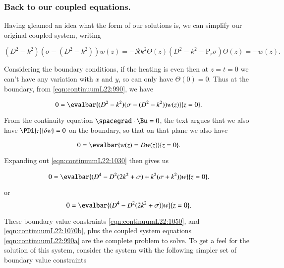 \subsubsection{Back to our coupled equations.}

Having gleamed an idea what the form of our solutions is, we can simplify our original coupled system, writing

\begin{subequations}
\label{eqn:continuumL22:990a}
\begin{equation}\label{eqn:continuumL22:990}
(D^2 - k^2) ( \sigma - (D^2 - k^2) ) w(z) = -\mathcal{R} k^2 \Theta(z)
\end{equation}
\begin{equation}\label{eqn:continuumL22:1010}
(D^2 - k^2 -\text{P}_r \sigma ) \Theta(z) = -w(z).
\end{equation}
\end{subequations}

Considering the boundary conditions, if the heating is even then at $z = t = 0$ we can't have any variation with $x$ and $y$, so can only have $\Theta(0) = 0$.  Thus at the boundary, from \ref{eqn:continuumL22:990}, we have

\begin{equation}\label{eqn:continuumL22:1030}
0 = \evalbar{(D^2 - k^2) ( \sigma - (D^2 - k^2) ) w(z)}{z = 0}.
\end{equation}

From the continuity equation $\spacegrad \cdot \Bu = 0$, the text argues that we also have $\PDi{z}{\delta w} = 0$ on the boundary, so that on that plane we also have

\begin{equation}\label{eqn:continuumL22:1050}
0 = \evalbar{w(z) = D w(z)}{z = 0}.
\end{equation}

Expanding out \ref{eqn:continuumL22:1030} then gives us

\begin{equation}\label{eqn:continuumL22:1070}
0 = \evalbar{(D^4 - D^2 ( 2 k^2 + \sigma ) + k^2(\sigma + k^2))w}{z = 0}.
\end{equation}

or
\begin{equation}\label{eqn:continuumL22:1070b}
0 = \evalbar{(D^4 - D^2 ( 2 k^2 + \sigma ))w}{z = 0}.
\end{equation}

These boundary value constraints \ref{eqn:continuumL22:1050}, and \ref{eqn:continuumL22:1070b}, plus the coupled system equations \ref{eqn:continuumL22:990a} are the complete problem to solve.  To get a feel for the solution of this system, consider the system with the following simpler set of boundary value constraints

